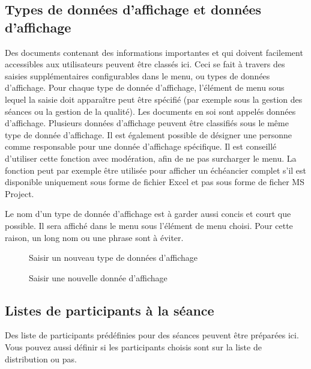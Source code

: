 \subsection{Types de données d'affichage et données d'affichage}

Des documents contenant des informations importantes et qui doivent facilement accessibles aux utilisateurs peuvent être classés ici. Ceci se fait à travers des saisies supplémentaires configurables dans le menu, ou types de données d'affichage. Pour chaque type de donnée d'affichage, l'élément de menu sous lequel la saisie doit apparaître peut être spécifié (par exemple sous la gestion des séances ou la gestion de la qualité). Les documents en soi sont appelés données d'affichage. Plusieurs données d'affichage peuvent être classifiés sous le même type de donnée d'affichage. Il est également possible de désigner une personne comme responsable pour une donnée d'affichage spécifique. Il est conseillé d'utiliser cette fonction avec modération, afin de ne pas surcharger le menu. La fonction peut par exemple être utilisée pour afficher un échéancier complet s'il est disponible uniquement sous forme de fichier Excel et pas sous forme de ficher MS Project.

\vspace{\baselineskip}

Le nom d'un type de donnée d'affichage est à garder aussi concis et court que possible. Il sera affiché dans le menu sous l'élément de menu choisi. Pour cette raison, un long nom ou une phrase sont à éviter.

\begin{figure}[H]
\caption{Saisir un nouveau type de données d'affichage}
\end{figure}

\begin{figure}[H]
\caption{Saisir une nouvelle donnée d'affichage}
\end{figure}


\subsection{Listes de participants à la séance}

Des liste de participants prédéfinies pour des séances peuvent être préparées ici. Vous pouvez aussi définir si les participants choisis sont sur la liste de distribution ou pas.

